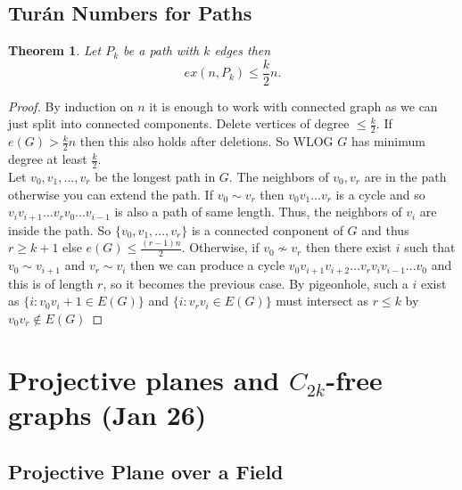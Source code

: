 \documentclass[a4paper]{article}
\newtheorem{thm}{Theorem}[section]
\begin{document}
\subsection{Turán Numbers for Paths} 
\begin{thm}
    Let $P_k$ be a path with $k$ edges then \[
    ex(n,P_k)\leq \frac{k}{2}n
    .\]
\end{thm}
\begin{proof}
        By induction on $n$ it is enough to work with connected graph as we can just split into connected components. Delete vertices of degree $\leq \frac{k}{2}$. If $e(G)>\frac{k}{2}n$ then this also holds after deletions. So WLOG $G$ has minimum degree at least $\frac{k}{2}$. \\
        Let $v_0,v_1,...,v_r$ be the longest path in $G$. The neighbors of $v_0,v_r$ are in the path otherwise you can extend the path. If $v_0\sim v_r$ then $v_0v_1...v_r$ is a cycle and so $v_iv_{i+1}...v_rv_0...v_{i-1}$ is also a path of same length. Thus, the neighbors of $v_i$ are inside the path. So $ \{v_0,v_1,...,v_r\}$ is a connected conponent of $G$ and thus $r\geq k+1$ else $e(G)\leq \frac{(r-1)n}{2}$. Otherwise, if $v_0 \not \sim v_r$ then there exist $i$ such that $v_0\sim v_{i+1}$ and $v_r\sim v_{i}$ then we can produce a cycle $v_0v_{i+1}v_{i+2}...v_{r}v_{i}v_{i-1}...v_{0}$ and this is of length $r$, so it becomes the previous case.     By pigeonhole, such a $i$ exist as $ \{i:v_0v_i+1\in E(G)\}$ and $ \{i:v_rv_i\in E(G)\}$ must intersect as $r\leq k$ by $v_0v_r\notin E(G)$
\end{proof}
\newpage
\section{Projective planes and $C_{2k}$-free graphs (Jan 26)}

\subsection{Projective Plane over a Field}
\end{document}

